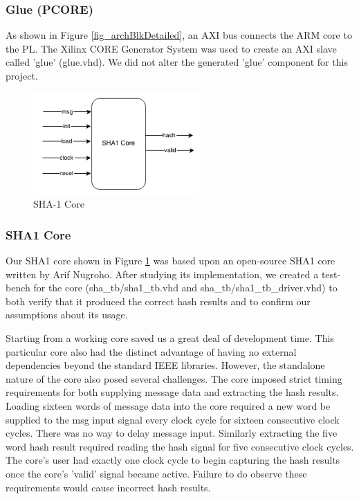 \documentclass[journal]{IEEEtran}
\begin{document}
\subsubsection{Glue (PCORE)}
As shown in Figure \ref{fig_archBlkDetailed}, an AXI bus connects the ARM core to the PL. The Xilinx CORE Generator System \cite{COREGEN} was used to create an AXI slave called 'glue' (glue.vhd).  We did not alter the generated 'glue' component for this project.
\begin{figure}[ht]
\centering
\includegraphics[width=2.5in]{Sha1_Core_Block_Diagram.png}
\caption{SHA-1 Core}
\label{fig_algoCore}
\end{figure} 
\subsubsection{SHA1 Core}
Our SHA1 core shown in Figure \ref{fig_algoCore} was based upon an open-source SHA1 core written by Arif Nugroho\cite{SHAOPEN}. After studying its implementation, we created a test-bench for the core (sha\_tb/sha1\_tb.vhd and sha\_tb/sha1\_tb\_driver.vhd) to both verify that it produced the correct hash results and to confirm our assumptions about its usage.

Starting from a working core saved us a great deal of development time. This particular core also had the distinct advantage of having no external dependencies beyond the standard IEEE libraries. However, the standalone nature of the core also posed several challenges. The core imposed strict timing requirements for both supplying message data and extracting the hash results. Loading sixteen words of message data into the core required a new word be supplied to the msg input signal every clock cycle for sixteen consecutive clock cycles. There was no way to delay message input. Similarly extracting the five word hash result required reading the hash signal for five consecutive clock cycles. The core's user had exactly one clock cycle to begin capturing the hash results once the core's 'valid' signal became active.  Failure to do observe these requirements would cause incorrect hash results.
\end{document}

